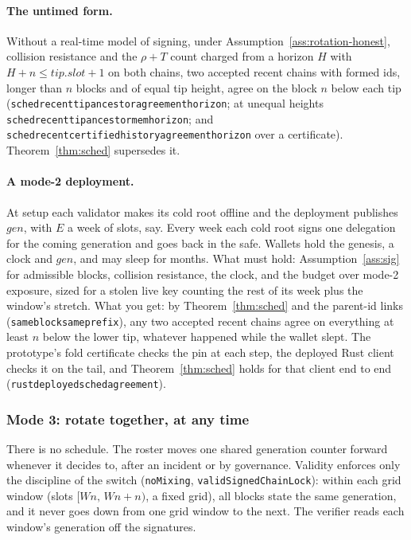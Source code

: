\documentclass[10pt]{article}
\DeclareRobustCommand{\code}[1]{{\renewcommand{\_}{\textunderscore\allowbreak}\texttt{#1}}}
\begin{document}
\paragraph{The untimed form.} Without a real-time model of signing,
under Assumption~\ref{ass:rotation-honest}, collision resistance and the $\rho + T$ count
charged from a horizon $H$ with $H + n \le \mathit{tip.slot} + 1$ on
both chains, two accepted recent chains with formed ids, longer than $n$
blocks and of equal tip height, agree on the block $n$ below each tip
(\code{sched\_recent\_tip\_ancestor\_agreement\_horizon}; at unequal
heights \code{sched\_recent\_tip\_ancestor\_mem\_horizon}; and
\code{sched\_recent\_certified\_history\_agreement\_horizon} over a
certificate). Theorem~\ref{thm:sched} supersedes it.

\paragraph{A mode-2 deployment.} At setup each validator makes its cold
root offline and the deployment publishes $\mathit{gen}$, with $E$ a
week of slots, say. Every week each cold root signs one delegation for
the coming generation and goes back in the safe. Wallets hold the
genesis, a clock and $\mathit{gen}$, and may sleep for months. What must
hold: Assumption~\ref{ass:sig} for admissible blocks, collision
resistance, the clock, and the budget over mode-2 exposure, sized for a
stolen live key counting the rest of its week plus the window's
stretch. What you get: by Theorem~\ref{thm:sched} and the parent-id
links (\code{same\_block\_same\_prefix}), any two accepted recent chains
agree on everything at least $n$ below the lower tip, whatever happened
while the wallet slept. The prototype's fold certificate checks the pin
at each step, the deployed Rust client checks it on the tail, and
Theorem~\ref{thm:sched} holds for that client end to end
(\code{rust\_deployed\_sched\_agreement}).

\subsubsection*{Mode 3: rotate together, at any time}

There is no schedule. The roster moves one shared generation counter
forward whenever it decides to, after an incident or by governance.
Validity enforces only the discipline of the switch (\code{noMixing},
\code{validSignedChainLock}): within each grid window (slots
$[Wn,\,Wn{+}n)$, a fixed grid), all blocks state the same generation,
and it never goes down from one grid window to the next. The verifier
reads each window's generation off the signatures.
\end{document}
